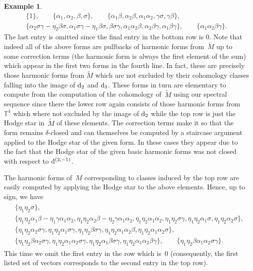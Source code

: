 \documentclass[pdftex]{sigma}
\numberwithin{equation}{section}
\theoremstyle{definition}
\newtheorem{egg}[tw]{Example}
\begin{document}
\begin{egg}
\begin{gather*}
\{1\},\qquad
\{\alpha_1,\alpha_2,\beta,\sigma\},\qquad
\{\alpha_1\beta,\alpha_2\beta,\alpha_1\alpha_2,\gamma\sigma,\gamma\beta\},\\
\{\alpha_2\sigma\gamma-\eta_2\beta\sigma,\alpha_1\sigma\gamma-\eta_1\beta\sigma, \beta\sigma\gamma,\alpha_1\alpha_2\beta,\alpha_2\beta\gamma,\alpha_1\beta\gamma\},\qquad
\{\alpha_1\alpha_2\beta\gamma\}.
\end{gather*}
The last entry is omitted since the final entry in the bottom row is $0$. Note that indeed all of the above forms are pullbacks of harmonic forms from~$\tilde{M}$ up to some correction terms (the harmonic form is always the first element of the sum) which appear in the first two forms in the fourth line. In fact, these are precisely those harmonic forms from $\tilde{M}$ which are not excluded by their cohomology classes falling into the image of ${\rm d}_2$ and ${\rm d}_3$. These forms in turn are elementary to compute from the computation of the cohomology of~$\tilde{M}$ using our spectral sequence since there the lower row again consists of those harmonic forms from $\mathbb{T}^4$ which where not excluded by the image of ${\rm d}_2$ while the top row is just the Hodge star in~$\tilde{M}$ of these elements. The correction terms make it so that the form remains $\delta$-closed and can themselves be computed by a staircase argument applied to the Hodge star of the given form. In these cases they appear due to the fact that the Hodge star of the given basic harmonic forms was not closed with respect to ${\rm d}^{(2,-1)}$.

The harmonic forms of~$M$ corresponding to classes induced by the top row are easily computed by applying the Hodge star to the above elements. Hence, up to sign, we have
\begin{gather*}
\begin{split}
&\{\eta_1\eta_2\sigma\},\\
&
 \{\eta_1\eta_2\alpha_1\beta-\eta_1\gamma\alpha_1\alpha_2,\eta_1\eta_2\alpha_2\beta-\eta_2\gamma\alpha_1\alpha_2,\eta_1\eta_2\alpha_1\alpha_2,\eta_1\eta_2\sigma\gamma,\eta_1\eta_2\alpha_1\sigma,\eta_1\eta_2\alpha_2\sigma\},\\
&\{\eta_1\eta_2\alpha_2\sigma\gamma,\eta_1\eta_2\alpha_1\sigma\gamma,\eta_1\eta_2\beta\sigma\gamma,\eta_1\eta_2\alpha_1\alpha_2\beta,\eta_1\eta_2\alpha_1\alpha_2\sigma\},\\
&\{\eta_1\eta_2\beta\alpha_2\sigma\gamma,\eta_1\eta_2\alpha_1\alpha_2\sigma\gamma, \eta_1\eta_2\alpha_1\beta\sigma\gamma,\eta_1\eta_2\alpha_1\alpha_2\beta\gamma\},\qquad
\{\eta_1\eta_2\beta\alpha_1\alpha_2\sigma\gamma\}.
\end{split}
\end{gather*}
This time we omit the first entry in the row which is~$0$ (consequently, the first listed set of vectors corresponds to the second entry in the top row).


\end{egg}
\end{document}
